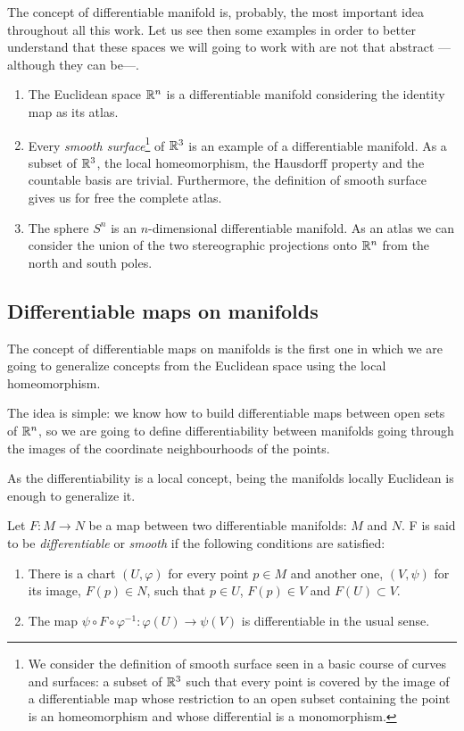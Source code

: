 \begin{example}
	The concept of differentiable manifold is, probably, the most important idea throughout all this work. Let us see then some examples in order to better understand that these spaces we will going to work with are not that abstract ---although they can be---.
	
	\begin{enumerate}
		\item The Euclidean space $\mathbb{R}^n$ is a differentiable manifold considering the identity map as its atlas.
		\item Every \emph{smooth surface}\footnote{We consider the definition of smooth surface seen in a basic course of curves and surfaces: a subset of $\mathbb{R}^3$ such that every point is covered by the image of a differentiable map whose restriction to an open subset containing the point is an homeomorphism and whose differential is a monomorphism.} of $\mathbb{R}^3$ is an example of a differentiable manifold. As a subset of $\mathbb{R}^3$, the local homeomorphism, the Hausdorff property and the countable basis are trivial. Furthermore, the definition of smooth surface gives us for free the complete atlas.
		\item The sphere $S^n$ is an $n$-dimensional differentiable manifold. As an atlas we can consider the union of the two stereographic projections onto $\mathbb{R}^n$ from the north and south poles.
	\end{enumerate}
\end{example}

\subsection{Differentiable maps on manifolds}

The concept of differentiable maps on manifolds is the first one in which we are going to generalize concepts from the Euclidean space using the local homeomorphism.

The idea is simple: we know how to build differentiable maps between open sets of $\mathbb{R}^n$, so we are going to define differentiability between manifolds going through the images of the coordinate neighbourhoods of the points.

As the differentiability is a local concept, being the manifolds locally Euclidean is enough to generalize it.

\begin{definition}
	Let $F \colon M \to N$ be a map between two differentiable manifolds: $M$ and $N$. F is said to be \emph{differentiable} or \emph{smooth} if the following conditions are satisfied:
	\begin{enumerate}
		\item There is a chart $(U, \varphi)$ for every point $p \in M$ and another one, $(V, \psi)$ for its image, $F(p) \in N$, such that $p \in U$, $F(p) \in V$ and $F(U) \subset V$.
		\item The map $\psi \circ F \circ \varphi^{-1} : \varphi(U) \to \psi(V)$ is differentiable in the usual sense.
	\end{enumerate}
\end{definition}

